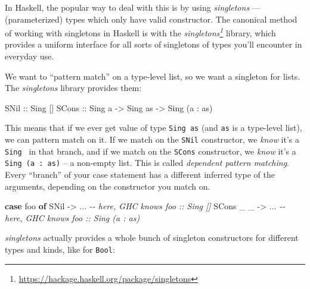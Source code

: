 \documentclass[]{article}
\newenvironment{Shaded}{}{}
\newcommand{\CommentTok}[1]{\textcolor[rgb]{0.38,0.63,0.69}{\textit{#1}}}
\newcommand{\DataTypeTok}[1]{\textcolor[rgb]{0.56,0.13,0.00}{#1}}
\newcommand{\KeywordTok}[1]{\textcolor[rgb]{0.00,0.44,0.13}{\textbf{#1}}}
\newcommand{\NormalTok}[1]{#1}
\newcommand{\OperatorTok}[1]{\textcolor[rgb]{0.40,0.40,0.40}{#1}}
\newcommand{\OtherTok}[1]{\textcolor[rgb]{0.00,0.44,0.13}{#1}}
\renewcommand{\href}[2]{#2\footnote{\url{#1}}}
\begin{document}
In Haskell, the popular way to deal with this is by using \emph{singletons} ---
(parameterized) types which only have valid constructor. The canonical method of
working with singletons in Haskell is with the
\emph{\href{https://hackage.haskell.org/package/singletons}{singletons}}
library, which provides a uniform interface for all sorts of singletons of types
you'll encounter in everyday use.

We want to ``pattern match'' on a type-level list, so we want a singleton for
lists. The \emph{singletons} library provides them:

\begin{Shaded}
\begin{Highlighting}[]
\DataTypeTok{SNil}\OtherTok{  ::} \DataTypeTok{Sing}\NormalTok{ \textquotesingle{}[]}
\DataTypeTok{SCons}\OtherTok{ ::} \DataTypeTok{Sing}\NormalTok{ a }\OtherTok{{-}>} \DataTypeTok{Sing}\NormalTok{ as }\OtherTok{{-}>} \DataTypeTok{Sing}\NormalTok{ (a \textquotesingle{}}\OperatorTok{:}\NormalTok{ as)}
\end{Highlighting}
\end{Shaded}

This means that if we ever get value of type \texttt{Sing\ as} (and \texttt{as}
is a type-level list), we can pattern match on it. If we match on the
\texttt{SNil} constructor, we \emph{know} it's a
\texttt{Sing\ \textquotesingle{}{[}{]}} in that branch, and if we match on the
\texttt{SCons} constructor, we \emph{know} it's a
\texttt{Sing\ (a\ \textquotesingle{}:\ as)} -- a non-empty list. This is called
\emph{dependent pattern matching}. Every ``branch'' of your case statement has a
different inferred type of the arguments, depending on the constructor you match
on.

\begin{Shaded}
\begin{Highlighting}[]
\KeywordTok{case}\NormalTok{ foo }\KeywordTok{of}
  \DataTypeTok{SNil}      \OtherTok{{-}>} \OperatorTok{...}   \CommentTok{{-}{-} here, GHC knows \textasciigrave{}foo :: Sing \textquotesingle{}[]\textasciigrave{}}
  \DataTypeTok{SCons}\NormalTok{ \_ \_ }\OtherTok{{-}>} \OperatorTok{...}   \CommentTok{{-}{-} here, GHC knows \textasciigrave{}foo :: Sing (a \textquotesingle{}: as)\textasciigrave{}}
\end{Highlighting}
\end{Shaded}

\emph{singletons} actually provides a whole bunch of singleton constructors for
different types and kinds, like for \texttt{Bool}:
\end{document}
